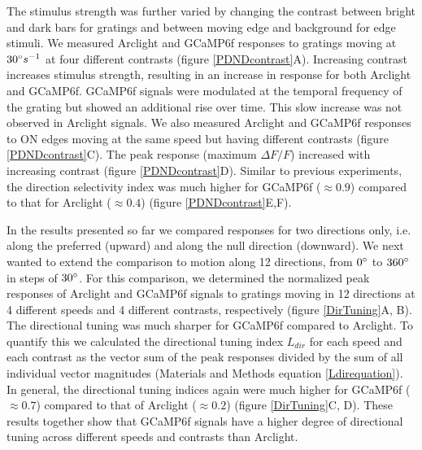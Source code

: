 \documentclass[9pt,lineno]{elife}
\begin{document}
The stimulus strength was further varied by changing the contrast between bright and dark bars for gratings and between moving edge and background for edge stimuli. We measured Arclight and GCaMP6f responses to gratings moving at $30\degree s^{-1}$ at four different contrasts (figure \ref{PDNDcontrast}A). Increasing contrast increases stimulus strength, resulting in an increase in response for both Arclight and GCaMP6f. GCaMP6f signals were modulated at the temporal frequency of the grating but showed an additional rise over time. This slow increase was not observed in Arclight signals. We also measured Arclight and GCaMP6f responses to ON edges moving at the same speed but having different contrasts (figure \ref{PDNDcontrast}C). The peak response (maximum $\Delta F/F$) increased with increasing contrast (figure \ref{PDNDcontrast}D). Similar to previous experiments, the direction selectivity index was much higher for GCaMP6f ($\approx0.9$) compared to that for Arclight ($\approx0.4$) (figure \ref{PDNDcontrast}E,F). 

In the results presented so far we compared responses for two directions only, i.e. along the preferred (upward) and along the null direction (downward). We next wanted to extend the comparison to motion along 12 directions, from $0\degree$ to $360\degree$ in steps of $30\degree$. For this comparison, we determined the normalized peak responses of Arclight and GCaMP6f signals to gratings moving in 12 directions at 4 different speeds and 4 different contrasts, respectively (figure \ref{DirTuning}A, B). The directional tuning was much sharper for GCaMP6f compared to Arclight. To quantify this we calculated the directional tuning index $L_{dir}$ \parencite{Mazurek2014} for each speed and each contrast as the vector sum of the peak responses divided by the sum of all individual vector magnitudes (Materials and Methods equation \eqref{Ldirequation}). In general, the directional tuning indices again were much higher for GCaMP6f ($\approx0.7$) compared to that of Arclight ($\approx0.2$) (figure \ref{DirTuning}C, D). These results together show that GCaMP6f signals have a higher degree of directional tuning across different speeds and contrasts than Arclight.
\end{document}
